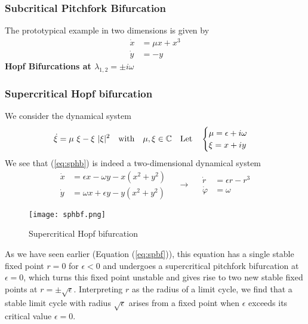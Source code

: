 \subsubsection{Subcritical Pitchfork Bifurcation}
The prototypical example in two dimensions is given by
\begin{equation}
	\begin{aligned}
		\dot{x}&=\mu x+x^3\\
		\dot{y}&=-y
	\end{aligned}
\end{equation}
\textbullet\quad\textbf{Hopf Bifurcations at $\lambda_{1,2}=\pm i\omega$}
\subsubsection{Supercritical Hopf bifurcation}
We consider the dynamical system
\begin{equation}{\label{eq:sphb}}
	\dot{\xi}=\mu\ \xi-\xi\ |\xi|^2\quad\text{with}\quad\mu,\xi\in\mathbb{C}\quad\text{Let}\quad
	\begin{cases}
		\mu=\epsilon+i\omega\\
		\xi=x+iy
	\end{cases}
\end{equation}
We see that (\ref{eq:sphb}) is indeed a two-dimensional dynamical system
\begin{equation}
	\begin{aligned}
		\dot{x}&=\epsilon x-\omega y-x(x^2+y^2)\\
		\dot{y}&=\omega x+\epsilon y-y(x^2+y^2)
	\end{aligned}\quad\rightarrow\quad
	\begin{aligned}
		\dot{r}&=\epsilon r-r^3\\
		\dot{\varphi}&=\omega
	\end{aligned}
\end{equation}
\begin{wrapfigure}{r}{0.4\linewidth}
	\centering
	\texttt{[image: sphbf.png]}
	\caption{Supercritical Hopf bifurcation}
	\label{fig:sphbf}
\end{wrapfigure}
As we have seen earlier (Equation (\ref{eq:spbf})), this equation has a single stable fixed point $r=0$ for $\epsilon<0$ and undergoes a supercritical pitchfork bifurcation at $\epsilon=0$, which turns this fixed point unstable and gives rise to two new stable fixed points at $r=\pm\sqrt{\epsilon}$.
Interpreting $r$ as the radius of a limit cycle, we find that a stable limit cycle with radius $\sqrt{\epsilon}$ arises from a fixed point when $\epsilon$ exceeds its critical value $\epsilon=0$.
